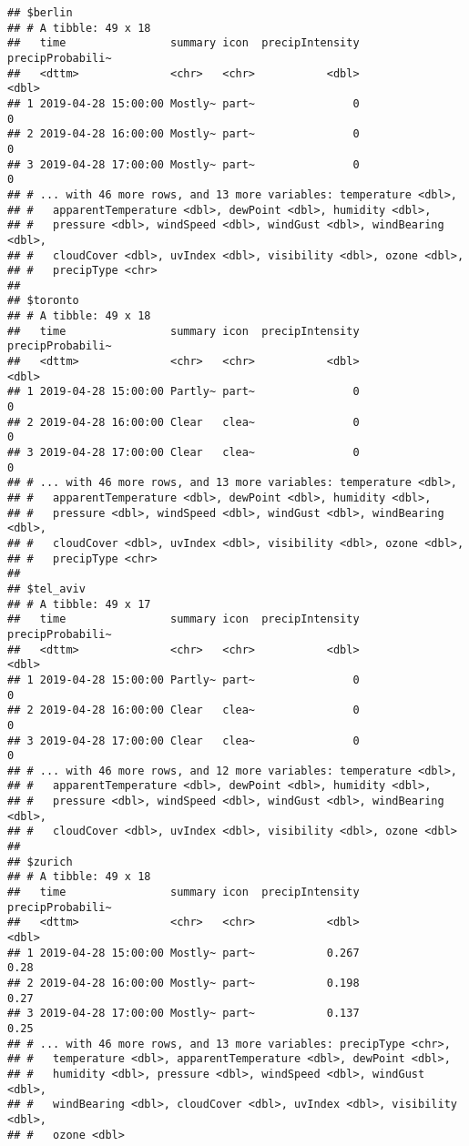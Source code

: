 \documentclass[]{book}
\begin{document}
\begin{verbatim}
## $berlin
## # A tibble: 49 x 18
##   time                summary icon  precipIntensity precipProbabili~
##   <dttm>              <chr>   <chr>           <dbl>            <dbl>
## 1 2019-04-28 15:00:00 Mostly~ part~               0                0
## 2 2019-04-28 16:00:00 Mostly~ part~               0                0
## 3 2019-04-28 17:00:00 Mostly~ part~               0                0
## # ... with 46 more rows, and 13 more variables: temperature <dbl>,
## #   apparentTemperature <dbl>, dewPoint <dbl>, humidity <dbl>,
## #   pressure <dbl>, windSpeed <dbl>, windGust <dbl>, windBearing <dbl>,
## #   cloudCover <dbl>, uvIndex <dbl>, visibility <dbl>, ozone <dbl>,
## #   precipType <chr>
## 
## $toronto
## # A tibble: 49 x 18
##   time                summary icon  precipIntensity precipProbabili~
##   <dttm>              <chr>   <chr>           <dbl>            <dbl>
## 1 2019-04-28 15:00:00 Partly~ part~               0                0
## 2 2019-04-28 16:00:00 Clear   clea~               0                0
## 3 2019-04-28 17:00:00 Clear   clea~               0                0
## # ... with 46 more rows, and 13 more variables: temperature <dbl>,
## #   apparentTemperature <dbl>, dewPoint <dbl>, humidity <dbl>,
## #   pressure <dbl>, windSpeed <dbl>, windGust <dbl>, windBearing <dbl>,
## #   cloudCover <dbl>, uvIndex <dbl>, visibility <dbl>, ozone <dbl>,
## #   precipType <chr>
## 
## $tel_aviv
## # A tibble: 49 x 17
##   time                summary icon  precipIntensity precipProbabili~
##   <dttm>              <chr>   <chr>           <dbl>            <dbl>
## 1 2019-04-28 15:00:00 Partly~ part~               0                0
## 2 2019-04-28 16:00:00 Clear   clea~               0                0
## 3 2019-04-28 17:00:00 Clear   clea~               0                0
## # ... with 46 more rows, and 12 more variables: temperature <dbl>,
## #   apparentTemperature <dbl>, dewPoint <dbl>, humidity <dbl>,
## #   pressure <dbl>, windSpeed <dbl>, windGust <dbl>, windBearing <dbl>,
## #   cloudCover <dbl>, uvIndex <dbl>, visibility <dbl>, ozone <dbl>
## 
## $zurich
## # A tibble: 49 x 18
##   time                summary icon  precipIntensity precipProbabili~
##   <dttm>              <chr>   <chr>           <dbl>            <dbl>
## 1 2019-04-28 15:00:00 Mostly~ part~           0.267             0.28
## 2 2019-04-28 16:00:00 Mostly~ part~           0.198             0.27
## 3 2019-04-28 17:00:00 Mostly~ part~           0.137             0.25
## # ... with 46 more rows, and 13 more variables: precipType <chr>,
## #   temperature <dbl>, apparentTemperature <dbl>, dewPoint <dbl>,
## #   humidity <dbl>, pressure <dbl>, windSpeed <dbl>, windGust <dbl>,
## #   windBearing <dbl>, cloudCover <dbl>, uvIndex <dbl>, visibility <dbl>,
## #   ozone <dbl>
\end{verbatim}
\end{document}
